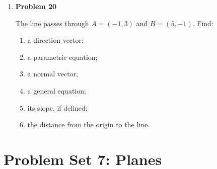 \begin{enumerate}
\item \textbf{Problem 20}\par
The line passes through \(A=(-1,3)\) and \(B=(5,-1)\). Find:
\begin{enumerate}
\item a direction vector;
\item a parametric equation;
\item a normal vector;
\item a general equation;
\item its slope, if defined;
\item the distance from the origin to the line.
\end{enumerate}
\end{enumerate}

\section{Problem Set 7: Planes}

